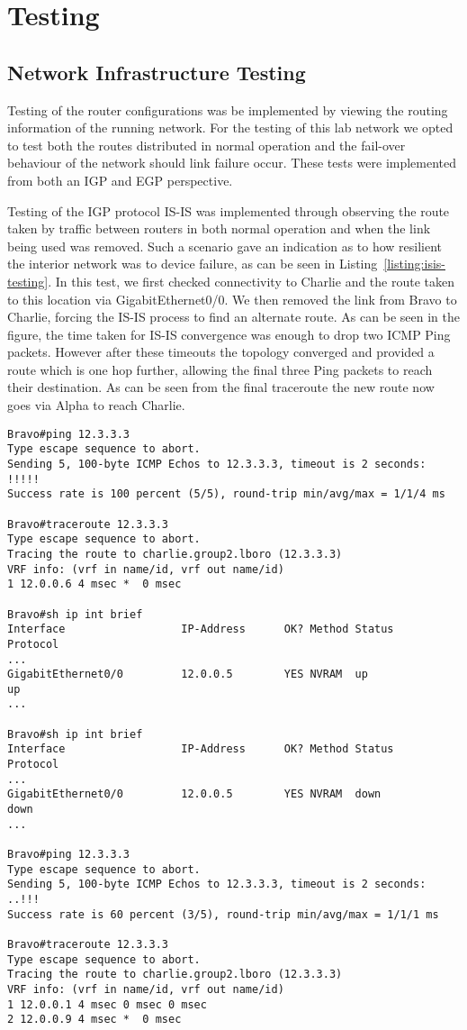 \chapter{Testing}
\section{Network Infrastructure Testing}
Testing of the router configurations was be implemented by viewing the routing
information of the running network. For the testing of this lab network we
opted to test both the routes distributed in normal operation and the fail-over
behaviour of the network should link failure occur. These tests were
implemented from both an IGP and EGP perspective.

Testing of the IGP protocol IS-IS was implemented through observing the route
taken by traffic between routers in both normal operation and when the link
being used was removed. Such a scenario gave an indication as to how resilient
the interior network was to device failure, as can be seen in
Listing~\ref{listing:isis-testing}. In this test, we first checked connectivity
to Charlie and the route taken to this location via GigabitEthernet0/0. We then
removed the link from Bravo to Charlie, forcing the IS-IS process to find an
alternate route. As can be seen in the figure, the time taken for IS-IS
convergence was enough to drop two ICMP Ping packets. However after these
timeouts the topology converged and provided a route which is one hop further,
allowing the final three Ping packets to reach their destination. As can be
seen from the final traceroute the new route now goes via Alpha to reach
Charlie.

\begin{lstlisting}[caption={Testing of IS-IS reaction to link failure}, label={listing:isis-testing}]
Bravo#ping 12.3.3.3
Type escape sequence to abort.
Sending 5, 100-byte ICMP Echos to 12.3.3.3, timeout is 2 seconds:
!!!!!
Success rate is 100 percent (5/5), round-trip min/avg/max = 1/1/4 ms

Bravo#traceroute 12.3.3.3
Type escape sequence to abort.
Tracing the route to charlie.group2.lboro (12.3.3.3)
VRF info: (vrf in name/id, vrf out name/id)
1 12.0.0.6 4 msec *  0 msec

Bravo#sh ip int brief
Interface                  IP-Address      OK? Method Status                Protocol
...
GigabitEthernet0/0         12.0.0.5        YES NVRAM  up                    up
...

Bravo#sh ip int brief
Interface                  IP-Address      OK? Method Status                Protocol
...
GigabitEthernet0/0         12.0.0.5        YES NVRAM  down                  down
...

Bravo#ping 12.3.3.3
Type escape sequence to abort.
Sending 5, 100-byte ICMP Echos to 12.3.3.3, timeout is 2 seconds:
..!!!
Success rate is 60 percent (3/5), round-trip min/avg/max = 1/1/1 ms

Bravo#traceroute 12.3.3.3
Type escape sequence to abort.
Tracing the route to charlie.group2.lboro (12.3.3.3)
VRF info: (vrf in name/id, vrf out name/id)
1 12.0.0.1 4 msec 0 msec 0 msec
2 12.0.0.9 4 msec *  0 msec
\end{lstlisting}

